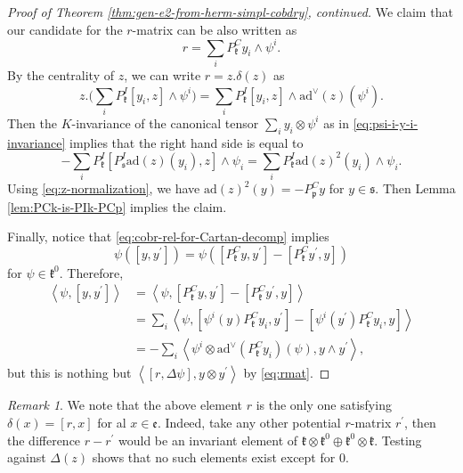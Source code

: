 \documentclass[a4paper,11pt]{amsart}
\newcommand{\fr}[1]{\mathfrak{#1}}
\newcommand{\ox}{\otimes}
\newcommand{\pr}{\prime}
\newcommand{\ad}{\mathrm{ad}}
\theoremstyle{definition}
\theoremstyle{remark}
\newtheorem{rmk}[thm]{Remark}
\begin{document}
\begin{proof}[Proof of Theorem \ref{thm:gen-e2-from-herm-simpl-cobdry}, continued]
We claim that our candidate for the $r$-matrix can be also written as
\begin{equation}
\label{eq:rmat}
r = \sum_i P^C_{\fr k} y_i \wedge \psi^i .
\end{equation}
By the centrality of $z$, we can write $r = z.\delta(z)$ as
\[
 z.\biggl(\sum_i P^I_{\fr k} [y_i, z] \wedge \psi^i\biggr) = \sum_i P^I_{\fr k} [y_i, z] \wedge \ad^\vee(z)(\psi^i).
\]
Then the $K$-invariance of the canonical tensor $\sum_i y_i \ox \psi^i$ as in \eqref{eq:psi-i-y-i-invariance} implies that the right hand side is equal to
\[
 -\sum_i P^I_{\fr k}[P^I_{\fr s} \ad(z)(y_i), z] \wedge \psi_i = \sum_i P^I_{\fr k} \ad(z)^2(y_i) \wedge \psi_i.
\]
Using \eqref{eq:z-normalization}, we have $\ad(z)^2(y) = -P^C_{\fr p} y$ for $y \in \fr s$.
Then Lemma \ref{lem:PCk-is-PIk-PCp} implies the claim.

Finally, notice that \eqref{eq:cobr-rel-for-Cartan-decomp} implies
\[
\psi\mathopen{}\left( \left[ y , y^\pr \right] \right) = \psi\mathopen{}\left( \left[ P^C_{\fr k} y , y^\pr \right] - \left[ P^C_{\fr k} y^\pr , y \right] \right)
\]
for $\psi \in \fr k^0$.
Therefore,
\[
\begin{split}
\left\langle \psi , \left[ y , y^\pr \right] \right\rangle &= \left\langle \psi , \left[ P^C_{\fr k} y , y^\pr \right] - \left[ P^C_{\fr k} y^\pr , y \right] \right\rangle \\
&= \sum_i \left\langle \psi , \left[ \psi^i(y) P^C_{\fr k} y_i , y^\pr \right] - \left[ \psi^i(y^\pr) P^C_{\fr k} y_i , y \right] \right\rangle \\
&= - \sum_i \left\langle \psi^i \ox \ad^\vee\mathopen{}\left( P^C_{\fr k} y_i \right)(\psi) , y \wedge y^\pr \right\rangle,
\end{split}
\]
but this is nothing but $\left\langle \left[ r , \Delta \psi \right] , y \ox y^\pr \right\rangle$ by \eqref{eq:rmat}.
\end{proof}

\begin{rmk}
We note that the above element $r$ is the only one satisfying $\delta(x) = [r, x]$ for al $x \in \fr{e}$.
Indeed, take any other potential $r$-matrix $r^\pr$, then the difference $r-r^\pr$ would be an invariant element of $\fr{k} \ox \fr{k}^0 \oplus \fr{k}^0 \ox \fr{k}$.
Testing against $\Delta(z)$ shows that no such elements exist except for $0$.
\end{rmk}
\end{document}
